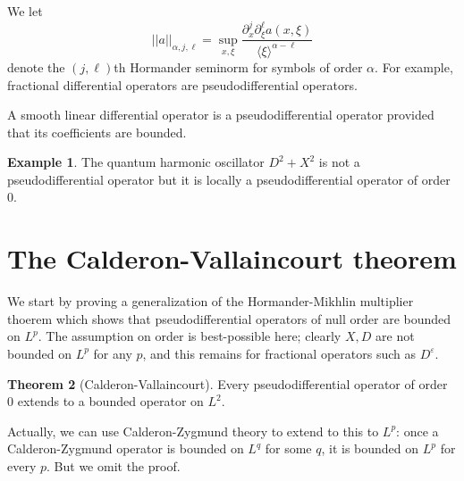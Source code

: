 \documentclass[12pt]{report}
\theoremstyle{definition}
\newtheorem{theorem}{Theorem}[chapter]
\newtheorem{example}[theorem]{Example}
\begin{document}
We let
$$||a||_{\alpha,j,\ell} = \sup_{x,\xi} \frac{\partial_x^j\partial_\xi^\ell a(x, \xi)}{\langle \xi\rangle^{\alpha - \ell}}$$
denote the $(j,\ell)$th Hormander seminorm for symbols of order $\alpha$.
For example, fractional differential operators are pseudodifferential operators.

A smooth linear differential operator is a pseudodifferential operator provided that its coefficients are bounded.
\begin{example}
The quantum harmonic oscillator $D^2 + X^2$ is not a pseudodifferential operator but it is locally a pseudodifferential operator of order $0$.
\end{example}

\section{The Calderon-Vallaincourt theorem}
We start by proving a generalization of the Hormander-Mikhlin multiplier thoerem which shows that pseudodifferential operators of null order are bounded on $L^p$.
The assumption on order is best-possible here; clearly $X,D$ are not bounded on $L^p$ for any $p$, and this remains for fractional operators such as $D^\varepsilon$.
\begin{theorem}[Calderon-Vallaincourt]
Every pseudodifferential operator of order $0$ extends to a bounded operator on $L^2$.
\end{theorem}
Actually, we can use Calderon-Zygmund theory to extend to this to $L^p$: once a Calderon-Zygmund operator is bounded on $L^q$ for some $q$, it is bounded on $L^p$ for every $p$. But we omit the proof.
\end{document}
